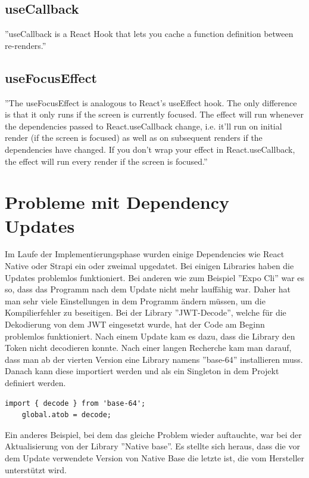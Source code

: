 \subsection{useCallback}\label{subsec:usecallback}
''useCallback is a React Hook that lets you cache a function definition between re-renders.''
\cite{useCallback}


\subsection{useFocusEffect}\label{subsec:usefocuseffect}
''The useFocusEffect is analogous to React's useEffect hook. The only difference is that it only runs if the screen
is currently focused.
The effect will run whenever the dependencies passed to React.useCallback change,
i.e. it'll run on initial render (if the screen is focused) as well as on subsequent renders if the dependencies
have changed. If you don't wrap your effect in React.useCallback, the effect will run every render if the screen
is focused.'' \cite{useFocusEffect}


\section{Probleme mit Dependency Updates}

Im Laufe der Implementierungsphase wurden einige Dependencies wie React Native oder Strapi ein oder zweimal upgedatet. Bei einigen Libraries haben die Updates problemlos funktioniert. Bei anderen wie zum Beispiel ''Expo Cli'' war es so, dass das Programm nach dem Update nicht mehr lauffähig war. Daher hat man sehr viele Einstellungen in dem Programm ändern müssen, um die Kompilierfehler zu beseitigen.
Bei der Library ''JWT-Decode'', welche  für die Dekodierung von dem JWT eingesetzt wurde, hat der Code am Beginn problemlos funktioniert. Nach einem Update kam es dazu, dass die Library den Token nicht decodieren konnte.
Nach einer langen Recherche kam man darauf, dass man ab der vierten Version eine Library namens ''base-64'' installieren muss.
Danach kann diese importiert werden und als ein Singleton in dem Projekt definiert werden.
\begin{lstlisting}[caption=base-64 als Singleton]
    import { decode } from 'base-64';
    global.atob = decode;
    \end{lstlisting}
\cite{jwt-decode-bug}

Ein anderes Beispiel, bei dem das gleiche Problem wieder auftauchte, war bei der Aktualisierung von der Library ''Native base''. Es stellte sich heraus,
dass die vor dem Update verwendete Version von Native Base die letzte ist, die vom Hersteller unterstützt wird.

